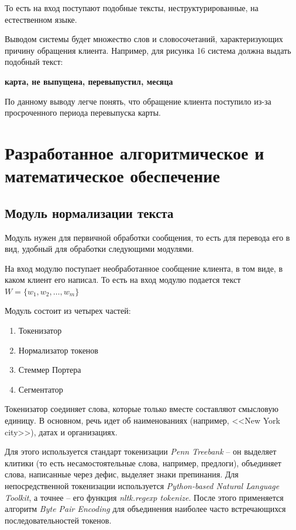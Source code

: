 \documentclass[a4paper,12pt,preview]{report} %
\begin{document}
	То есть на вход поступают подобные тексты, неструктурированные, на естественном языке.
	
	Выводом системы будет множество слов и словосочетаний, характеризующих причину обращения клиента. Например, для рисунка 16 система должна выдать подобный текст:
	
	\begin{center}
		\textbf{карта, не выпущена, перевыпустил, месяца}
	\end{center}
	
	По данному выводу легче понять, что обращение клиента поступило из-за просроченного периода перевыпуска карты.
	
	
	\section{Разработанное алгоритмическое и математическое обеспечение}
	\subsection{Модуль нормализации текста}
	
	Модуль нужен для первичной обработки сообщения, то есть для перевода его в вид, удобный для обработки следующими модулями. 
	
	На вход модулю поступает необработанное сообщение клиента, в том виде, в каком клиент его написал. То есть на вход модулю подается текст $W = \{w_1, w_2, \dots, w_m\}$
	
	Модуль состоит из четырех частей:
	\begin{enumerate}
		\item Токенизатор
		\item Нормализатор токенов
		\item Стеммер Портера
		\item Сегментатор
	\end{enumerate}
	
	Токенизатор соединяет слова, которые только вместе составляют смысловую единицу. В основном, речь идет об наименованиях (например, <<New York city>>), датах и организациях. 
	
	Для этого используется стандарт токенизации \textit{Penn Treebank} -- он выделяет клитики (то есть несамостоятельные слова, например, предлоги), объединяет слова, написанные через дефис, выделяет знаки препинания. Для непосредственной токенизации используется \textit{Python-based Natural Language Toolkit}, а точнее -- его функция  \textit{nltk.regexp tokenize}. После этого применяется алгоритм \textit{Byte Pair Encoding} для объединения наиболее часто встречающихся последовательностей токенов.
	
\end{document}
